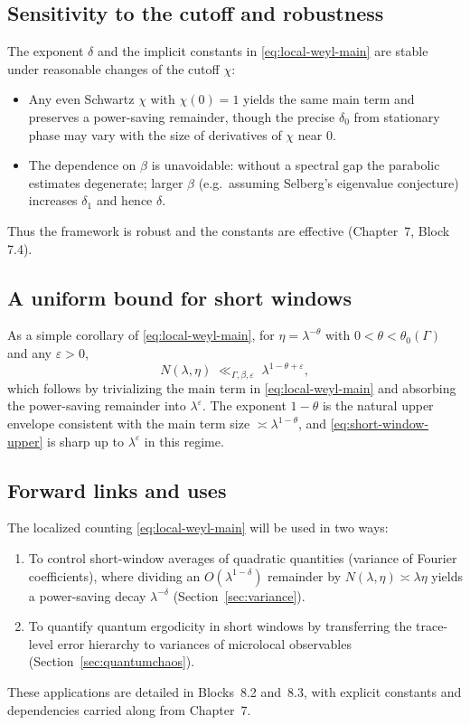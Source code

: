 \subsection{Sensitivity to the cutoff and robustness}
The exponent $\delta$ and the implicit constants in \eqref{eq:local-weyl-main} are stable under reasonable changes of the cutoff $\chi$:
\begin{itemize}
\item Any even Schwartz $\chi$ with $\chi(0)=1$ yields the same main term and preserves a power-saving remainder, though the precise $\delta_0$ from stationary phase may vary with the size of derivatives of $\chi$ near $0$.
\item The dependence on $\beta$ is unavoidable: without a spectral gap the parabolic estimates degenerate; larger $\beta$ (e.g.\ assuming Selberg's eigenvalue conjecture) increases $\delta_1$ and hence $\delta$.
\end{itemize}
Thus the framework is robust and the constants are effective (Chapter~7, Block 7.4).

\subsection{A uniform bound for short windows}
As a simple corollary of \eqref{eq:local-weyl-main}, for $\eta=\lambda^{-\theta}$ with $0<\theta<\theta_0(\Gamma)$ and any $\varepsilon>0$,
\begin{equation}\label{eq:short-window-upper}
N(\lambda,\eta)\;\ll_{\Gamma,\beta,\varepsilon}\; \lambda^{1-\theta+\varepsilon},
\end{equation}
which follows by trivializing the main term in \eqref{eq:local-weyl-main} and absorbing the power-saving remainder into $\lambda^{\varepsilon}$. The exponent $1-\theta$ is the natural upper envelope consistent with the main term size $\asymp \lambda^{1-\theta}$, and \eqref{eq:short-window-upper} is sharp up to $\lambda^{\varepsilon}$ in this regime.

\subsection{Forward links and uses}
The localized counting \eqref{eq:local-weyl-main} will be used in two ways:
\begin{enumerate}
\item To control short-window averages of quadratic quantities (variance of Fourier coefficients), where dividing an $O(\lambda^{1-\delta})$ remainder by $N(\lambda,\eta)\asymp \lambda\eta$ yields a power-saving decay $\lambda^{-\delta}$ (Section~\ref{sec:variance}).
\item To quantify quantum ergodicity in short windows by transferring the trace-level error hierarchy to variances of microlocal observables (Section~\ref{sec:quantumchaos}).
\end{enumerate}
These applications are detailed in Blocks~8.2 and~8.3, with explicit constants and dependencies carried along from Chapter~7.

